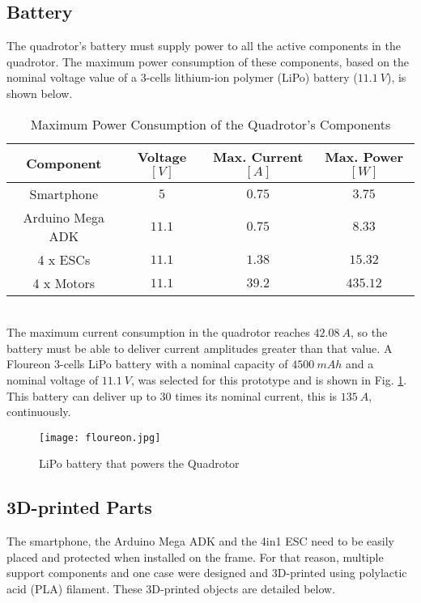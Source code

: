 \subsection{Battery}
The quadrotor's battery must supply power to all the active components in the quadrotor. The maximum power consumption of these components, based on the nominal voltage value of a 3-cells lithium-ion polymer (LiPo) battery ($11.1\ V$), is shown below.\\
\begin{table}[h]
\small
\begin{center}
\caption{Maximum Power Consumption of the Quadrotor's Components}\label{tb:power}
\begin{tabular}{c|c|c|c}\hline
\rule{0pt}{3ex} Component & Voltage $[V]$ & Max. Current $[A]$ & Max. Power $[W]$ \\\hline\hline
\rule{0pt}{3ex}
Smartphone &  $5$ & $0.75$ & $3.75$ \\[0.4ex]
Arduino Mega ADK & $11.1$ & $0.75$ & $8.33$ \\[0.4ex] 
4 x ESCs &  $11.1$ & $1.38$ & $15.32$ \\[0.4ex]
4 x Motors & $11.1$ & $39.2$ & $435.12$ \\[0.4ex]\hline
\end{tabular}
\end{center}
\end{table}
\vspace{-0.5cm}
\\The maximum current consumption in the quadrotor reaches $42.08\ A$, so the battery must be able to deliver current amplitudes greater than that value. A Floureon 3-cells LiPo battery with a nominal capacity of $4500\ mAh$ and a nominal voltage of $11.1\ V$, was selected for this prototype and is shown in Fig. \ref{fig:battery}. This battery can deliver up to $30$ times its nominal current, this is $135\ A$, continuously.
\begin{figure}[H]
	\begin{center}
		\texttt{[image: floureon.jpg]}    
		\caption[LiPo battery that powers the Quadrotor]{LiPo battery that powers the Quadrotor\protect\footnotemark} 
		\label{fig:battery}
	\end{center}
\end{figure}

\subsection{3D-printed Parts}
The smartphone, the Arduino Mega ADK and the 4in1 ESC need to be easily placed and protected when installed on the frame. For that reason, multiple support components and one case were designed and 3D-printed using polylactic acid (PLA) filament. These 3D-printed objects are detailed below.

